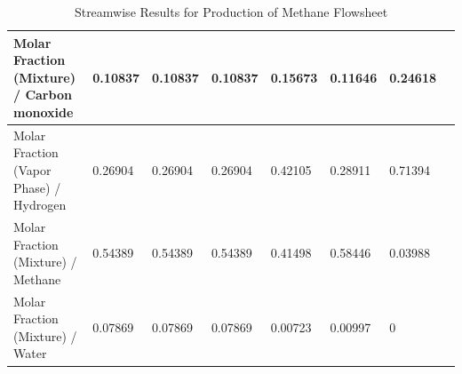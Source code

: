 \documentclass[a4paper,12pt]{article}
\begin{document}
\begin{table}[ht]
{\begin{tabular}{|l|l|l|l|l|l|l|l|}
Molar Fraction (Mixture)  /  Carbon monoxide & 0.10837   & 0.10837  & 0.10837  & 0.15673   & 0.11646  & 0.24618      &       \\ \hline
Molar Fraction (Vapor Phase)  /  Hydrogen    & 0.26904   & 0.26904  & 0.26904  & 0.42105   & 0.28911  & 0.71394      &       \\ \hline
Molar Fraction (Mixture)  /  Methane         & 0.54389   & 0.54389  & 0.54389  & 0.41498   & 0.58446  & 0.03988      &       \\ \hline
Molar Fraction (Mixture)  /  Water           & 0.07869   & 0.07869  & 0.07869  & 0.00723   & 0.00997  & 0            &       \\ \hline
\end{tabular}%
}
\caption{Streamwise Results for Production of Methane Flowsheet}
\end{table}
\end{document}
